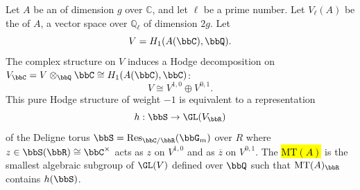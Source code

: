 \begin{definition} \label{definition:mumford_tate_group_of_an_abelian_variety_over_the_complex_numbers}
Let $A$ be an  of dimension $g$ over $\mathbb{C}$, and let $\ell$ be a prime number. Let $V_\ell(A)$ be the  of $A$, a vector space over $\mathbb{Q}_\ell$ of dimension $2g$. 
Let 
$$V = H_1(A(\bbC), \bbQ).$$
The complex structure on $V$ induces a Hodge decomposition on $V_\bbC = V \otimes_\bbQ \bbC \cong H_1(A(\bbC), \bbC)$:
$$V \cong V^{1,0} \oplus V^{0,1}.$$
This pure Hodge structure of weight $-1$ is equivalent to a representation 
$$h: \bbS \to \GL(V_\bbR)$$
of the Deligne torus $\bbS = \operatorname{Res}_{\bbC/\bbR} (\bbG_m)$ over $R$ where $z \in \bbS(\bbR) \cong \bbC^\times$ acts as $z$ on $V^{1,0}$ and as $\overline{z}$ on $V^{0,1}$. The  \hl{$\mathrm{MT}(A)$} is the smallest algebraic subgroup of $\GL(V)$ defined over $\bbQ$ such that $\mathrm{MT}(A)_\bbR$ contains $h(\bbS)$.






\end{definition}
